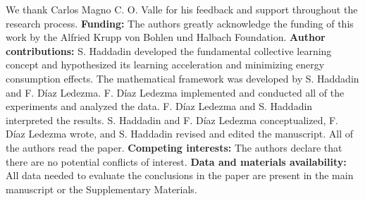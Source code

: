 \documentclass[12pt]{article}
\begin{document}
We thank Carlos Magno C. O. Valle for his feedback and support throughout the research process. \textbf{Funding:} The authors greatly acknowledge the funding of this work by the Alfried Krupp von Bohlen und Halbach Foundation. \textbf{Author contributions:} S. Haddadin developed the fundamental collective learning concept and hypothesized its learning acceleration and minimizing energy consumption effects.  The mathematical framework was developed by S. Haddadin and F. Díaz Ledezma. F. Díaz Ledezma implemented and conducted all of the experiments and analyzed the data. F. Díaz Ledezma and S. Haddadin interpreted the results. S. Haddadin and F. Díaz Ledezma conceptualized, F. Díaz Ledezma wrote, and S. Haddadin revised and edited the manuscript. All of the authors read the paper. \textbf{Competing interests:} The authors declare that there are no potential conflicts of interest. \textbf{Data and materials availability:} All data needed to evaluate the conclusions in the paper are present in the main manuscript or the Supplementary Materials. %

% 
\end{document}
